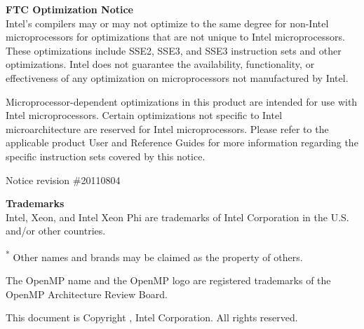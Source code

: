 \documentclass{book}
\begin{document}
\hypersetup{pageanchor=false,citecolor=blue}

{\bf FTC Optimization Notice}
\\
Intel's compilers may or may not optimize to the same degree for non-Intel microprocessors for
optimizations that are not unique to Intel microprocessors. These optimizations include SSE2,
SSE3, and SSE3 instruction sets and other optimizations. Intel does not guarantee the
availability, functionality, or effectiveness of any optimization on microprocessors not
manufactured by Intel.

Microprocessor-dependent optimizations in this product are intended for use with Intel
microprocessors. Certain optimizations not specific to Intel microarchitecture are reserved for
Intel microprocessors. Please refer to the applicable product User and Reference Guides for
more information regarding the specific instruction sets covered by this notice.

Notice revision \#20110804

{\bf Trademarks}
\\
Intel, Xeon, and Intel Xeon Phi are trademarks of Intel Corporation in the U.S. and/or other countries.

\textsuperscript{*} Other names and brands may be claimed as the property of others.

The OpenMP name and the OpenMP logo are registered trademarks of the OpenMP Architecture Review Board.

This document is Copyright , Intel Corporation. All rights reserved.

\clearemptydoublepage
{}
\tableofcontents
\clearemptydoublepage
{}
\hypersetup{pageanchor=true,citecolor=blue}
\end{document}
